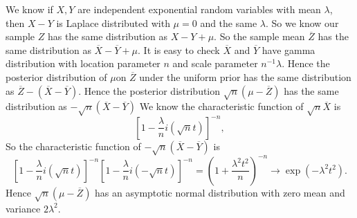 We know if $X,Y$ are independent exponential random variables with
mean $\lambda$, then $X-Y$ is Laplace distributed with $\mu=0$
and the same $\lambda$. So we know our sample $Z$ has the same distribution
as $X-Y+\mu$. So the sample mean $\overline{Z}$ has the same distribution
as $\overline{X}-\overline{Y}+\mu$. It is easy to check $\overline{X}$
and $\overline{Y}$ have gamma distribution with location parameter
$n$ and scale parameter $n^{-1}\lambda$. Hence the posterior distribution
of $\mu$on $\overline{Z}$ under the uniform prior has the same distribution
as $\overline{Z}-\left(\overline{X}-\overline{Y}\right)$. Hence the
posterior distribution $\sqrt{n}\left(\mu-\overline{Z}\right)$ has
the same distribution as $-\sqrt{n}\left(\overline{X}-\overline{Y}\right)$
We know the characteristic function of $\sqrt{n}$$\overline{X}$
is 
\[
\left[1-\frac{\lambda}{n}i\left(\sqrt{n}t\right)\right]^{-n},
\]
So the characteristic function of $-\sqrt{n}\left(\overline{X}-\overline{Y}\right)$
is 
\[
\left[1-\frac{\lambda}{n}i\left(\sqrt{n}t\right)\right]^{-n}\left[1-\frac{\lambda}{n}i\left(-\sqrt{n}t\right)\right]^{-n}=\left(1+\frac{\lambda^{2}t^{2}}{n}\right)^{-n}\rightarrow\exp\left(-\lambda^{2}t^{2}\right).
\]
Hence $\sqrt{n}\left(\mu-\overline{Z}\right)$ has an asymptotic normal
distribution with zero mean and variance $2\lambda^{2}$.


